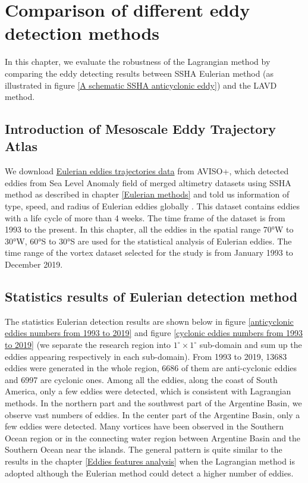 \chapter{Comparison of different eddy detection methods}\label{sec-eval}

In this chapter, we evaluate the robustness of the Lagrangian method by comparing the eddy detecting results between SSHA Eulerian method (as illustrated in figure \ref{A schematic SSHA anticyclonic eddy}) and the LAVD method.

\section{Introduction of Mesoscale Eddy Trajectory Atlas}

We download \href{https://www.aviso.altimetry.fr/en/data/products/value-added-products/global-mesoscale-eddy-trajectory-product/meta2-0-dt.html}{Eulerian eddies trajectories data}  from AVISO+, which detected eddies from Sea Level Anomaly field of merged altimetry datasets using SSHA method as described in chapter \ref{Eulerian methods} and told us information of type, speed, and radius of Eulerian eddies globally \cite{chelton2011global}. This dataset contains eddies with a life cycle of more than 4 weeks. The time frame of the dataset is from 1993 to the present. In this chapter, all the eddies in the spatial range 70°W to 30°W, 60°S to 30°S are used for the statistical analysis of Eulerian eddies. The time range of the vortex dataset selected for the study is from January 1993 to December 2019.


\section{Statistics results of Eulerian detection method}


The statistics Eulerian detection results are shown below in figure \ref{anticyclonic eddies numbers from 1993 to 2019} and figure \ref{cyclonic eddies numbers from 1993 to 2019} (we separate the research region into $1^\circ \times 1^\circ$ sub-domain and sum up the eddies appearing respectively in each sub-domain). From 1993 to 2019, 13683 eddies were generated in the whole region, 6686 of them are anti-cyclonic eddies and 6997 are cyclonic ones. Among all the eddies, along the coast of South America, only a few eddies were detected, which is consistent with Lagrangian methods. In the northern part and the southwest part of the Argentine Basin, we observe vast numbers of eddies. In the center part of the Argentine Basin, only a few eddies were detected. Many vortices have been observed in the Southern Ocean region or in the connecting water region between Argentine Basin and the Southern Ocean near the islands. The general pattern is quite similar to the results in the chapter \ref{Eddies features analysis} when the Lagrangian method is adopted although the Eulerian method could detect a higher number of eddies.

